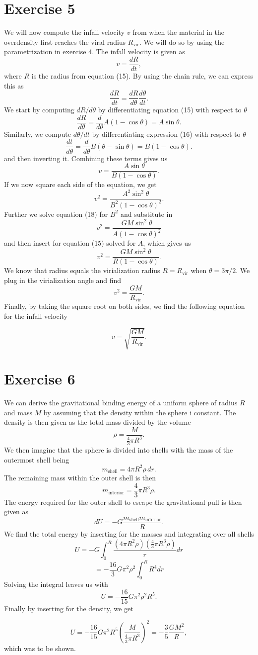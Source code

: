 \documentclass[a4paper]{article}
\begin{document}
\section*{Exercise 5}

We will now compute the infall velocity $v$ from when the material in the overdensity first reaches the viral radius $R_{\text{vir}}$. We will do so by using the parametrization in exercise 4. The infall velocity is given as
\[
    v = \frac{dR}{dt},
\]
where $R$ is the radius from equation (15). By using the chain rule, we can express this as 
\[
    \frac{dR}{dt} = \frac{dR}{d\theta} \frac{d \theta}{dt}.
\]
We start by computing $dR/d\theta$ by differentiating equation (15) with respect to $\theta$
\[
    \frac{dR}{d\theta} = \frac{d}{d\theta} A(1-\cos\theta) = A \sin \theta.
\]
Similarly, we compute $d\theta/dt$ by differentiating expression (16) with respect to $\theta$
\[
    \frac{dt}{d\theta} = \frac{d}{d\theta} B(\theta-\sin\theta) = B(1 - \cos \theta).
\]
and then inverting it. Combining these terms gives us
\[
    v = \frac{A \sin \theta}{B (1- \cos \theta)}.
\]
If we now square each side of the equation, we get
\[
v^2 = \frac{A^2 \sin^2 \theta}{B^2 (1-\cos \theta)^2}.
\]
Further we solve equation (18) for $B^2$ and substitute in
\[
v^2 = \frac{GM\sin^2 \theta}{A(1-\cos \theta)^2}
\]
and then insert for equation (15) solved for $A$, which gives us
\[
    v^2 = \frac{GM \sin^2 \theta}{R (1-\cos \theta)}.
\]
We know that radius equals the virialization radius $R=R_\text{vir}$ when $\theta = 3\pi / 2$. We plug in the virialization angle and find
\[
    v^2 = \frac{GM}{R_\text{vir}}.
\]
Finally, by taking the square root on both sides, we find the following equation for the infall velocity

\begin{equation}
    v = \sqrt{\frac{GM}{R_\text{vir}}}.
\end{equation}
\section*{Exercise 6}

We can derive the gravitational binding energy of a uniform sphere of radius $R$ and mass $M$ by assuming that the density within the sphere i constant. The density is then given as the total mass divided by the volume
\[
\rho = \frac{M}{\frac{4}{3} \pi R^3}.
\]
We then imagine that the sphere is divided into shells with the mass of the outermost shell being
\[
m_{\text{shell}} = 4\pi R^2 \rho\, dr.
\]
The remaining mass within the outer shell is then
\[
m_{\text{interior}} = \frac{4}{3}\pi R^3 \rho.
\]
The energy required for the outer shell to escape the gravitational pull is then given as
\[
dU = -G\frac{m_{\text{shell}} m_{\text{interior}} }{R}.
\]
We find the total energy by inserting for the masses and integrating over all shells
\[
U = -G \int^R_0 \frac{\left(4\pi R^2 \rho\right)  \left(\frac{4}{3}\pi R^3 \rho \right)}{r} dr
\]
\[
= - \frac{16}{3} G\pi^2 \rho^2 \int_0^R R^4 dr
\]
Solving the integral leaves us with 
\[
U = - \frac{16}{15} G \pi^2 \rho^2 R^5.
\]
Finally by inserting for the density, we get

\[
U = - \frac{16}{15} G \pi^2 R^5 \left(\frac{M}{\frac{4}{3} \pi R^3}\right)^2 = - \frac{3}{5} \frac{GM^2}{R},
\]
which was to be shown.
\end{document}
